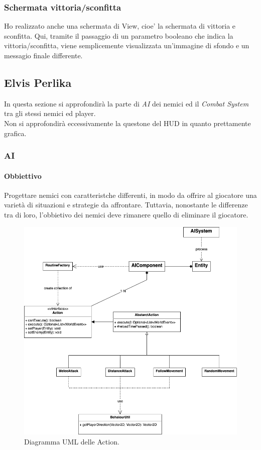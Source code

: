 \documentclass[a4paper,12pt]{report}
\begin{document}
\subsubsection{Schermata vittoria/sconfitta}
Ho realizzato anche una schermata di View, cioe' la schermata di vittoria e sconfitta. Qui, tramite il passaggio di un parametro booleano che indica la vittoria/sconfitta, viene semplicemente visualizzata un'immagine di sfondo e un messagio finale differente.

\pagebreak


\subsection{Elvis Perlika}
In questa sezione si approfondirà la parte di \textit{AI} dei nemici
ed il \textit{Combat System} tra gli stessi nemici ed player.\\
Non si approfondirà eccessivamente la questone del HUD in quanto prettamente grafica.

\subsubsection{AI}

\paragraph{Obbiettivo}
Progettare nemici con caratteristche differenti, in modo
da offrire al giocatore una varietà di situazioni e strategie da affrontare.
Tuttavia, nonostante le differenze tra di loro, l'obbietivo dei nemici deve
rimanere quello di eliminare il giocatore.
\begin{figure}[h]
	\centering
	\includegraphics[width=\textwidth]{uml/UML_AI.png}
	\caption{Diagramma UML delle Action.}
\end{figure}
\end{document}
